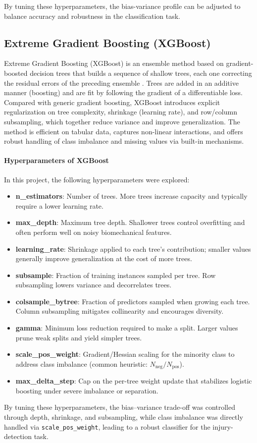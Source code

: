 By tuning these hyperparameters, the bias-variance profile can be adjusted to balance accuracy and robustness in the classification task.


\subsection{Extreme Gradient Boosting (XGBoost)}\label{subsec:method-xgboost}
Extreme Gradient Boosting (XGBoost) is an ensemble method based on gradient-boosted decision trees that builds a sequence of shallow trees, each one correcting the residual errors of the preceding ensemble \citep{Chen2016XGBoost}. Trees are added in an additive manner (boosting) and are fit by following the gradient of a differentiable loss. Compared with generic gradient boosting, XGBoost introduces explicit regularization on tree complexity, shrinkage (learning rate), and row/column subsampling, which together reduce variance and improve generalization. The method is efficient on tabular data, captures non-linear interactions, and offers robust handling of class imbalance and missing values via built-in mechanisms.

\paragraph{Hyperparameters of XGBoost}
In this project, the following hyperparameters were explored:
\begin{itemize}
    \item \textbf{n\_estimators}: Number of trees. More trees increase capacity and typically require a lower learning rate.
    \item \textbf{max\_depth}: Maximum tree depth. Shallower trees control overfitting and often perform well on noisy biomechanical features.
    \item \textbf{learning\_rate}: Shrinkage applied to each tree's contribution; smaller values generally improve generalization at the cost of more trees.
    \item \textbf{subsample}: Fraction of training instances sampled per tree. Row subsampling lowers variance and decorrelates trees.
    \item \textbf{colsample\_bytree}: Fraction of predictors sampled when growing each tree. Column subsampling mitigates collinearity and encourages diversity.
    \item \textbf{gamma}: Minimum loss reduction required to make a split. Larger values prune weak splits and yield simpler trees.
    \item \textbf{scale\_pos\_weight}: Gradient/Hessian scaling for the minority class to address class imbalance (common heuristic: $N_{\text{neg}}/N_{\text{pos}}$).
    \item \textbf{max\_delta\_step}: Cap on the per-tree weight update that stabilizes logistic boosting under severe imbalance or separation.
\end{itemize}
By tuning these hyperparameters, the bias--variance trade-off was controlled through depth, shrinkage, and subsampling, while class imbalance was directly handled via \texttt{scale\_pos\_weight}, leading to a robust classifier for the injury-detection task.

